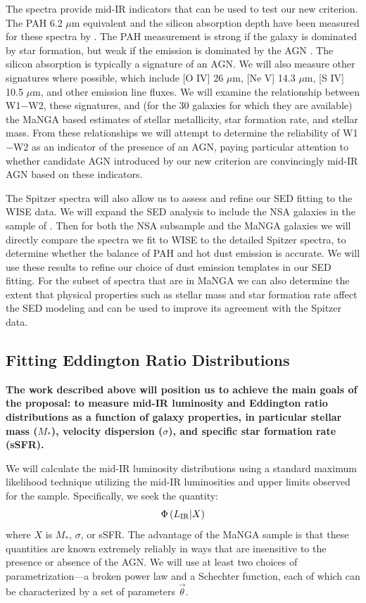 \documentclass[12pt, preprint]{hacked-aastex}
\begin{document}
The spectra provide mid-IR indicators that can be used to test our new
criterion.  The PAH 6.2 $\mu$m equivalent and the silicon absorption
depth have been measured for these spectra by \cite{lambrides19a}.  The
PAH measurement is strong if the galaxy is dominated by star
formation, but weak if the emission is dominated by the AGN
\cite{sajina22a}.  The silicon absorption is typically a signature of
an AGN.  We will also measure other signatures where possible, which
include [O IV] 26 $\mu$m, [Ne V] 14.3 $\mu$m, [S IV] 10.5 $\mu$m, and
other emission line fluxes.  We will examine the relationship between
W1$-$W2, these signatures, and (for the 30 galaxies for which they are
available) the MaNGA based estimates of stellar metallicity, star
formation rate, and stellar mass. From these relationships we will
attempt to determine the reliability of W1$-$W2 as an indicator of the
presence of an AGN, paying particular attention to whether candidate
AGN introduced by our new criterion are convincingly mid-IR AGN based
on these indicators.

The Spitzer spectra will also allow us to assess and refine our SED
fitting to the WISE data. We will expand the SED analysis to include
the NSA galaxies in the sample of \cite{lambrides19a}.  Then for both the
NSA subsample and the MaNGA galaxies we will directly compare the
spectra we fit to WISE to the detailed Spitzer spectra, to determine
whether the balance of PAH and hot dust emission is accurate. We will
use these results to refine our choice of dust emission templates in
our SED fitting. For the subset of spectra that are in MaNGA we can
also determine the extent that physical properties such as stellar
mass and star formation rate affect the SED modeling and can be used
to improve its agreement with the Spitzer data.

\subsection{Fitting Eddington Ratio Distributions}
\label{sec:erd}

{\bf The work described above will position us to achieve the main
  goals of the proposal: to measure mid-IR luminosity and Eddington
  ratio distributions as a function of galaxy properties, in
  particular stellar mass ($M_\ast$), velocity dispersion ($\sigma$),
  and specific star formation rate (sSFR).}

We will calculate the mid-IR luminosity distributions using a standard
maximum likelihood technique utilizing the mid-IR luminosities and
upper limits observed for the sample. Specifically, we seek the
quantity:
\begin{equation}
\Phi\left(L_{\rm IR} | X\right)
\end{equation}
where $X$ is $M_\ast$, $\sigma$, or sSFR. The advantage of the MaNGA
sample is that these quantities are known extremely reliably in ways
that are insensitive to the presence or absence of the AGN. We will
use at least two choices of parametrization---a broken power law and a
Schechter function, each of which can be characterized by a set of
parameters $\vec{\theta}$.
\end{document}
